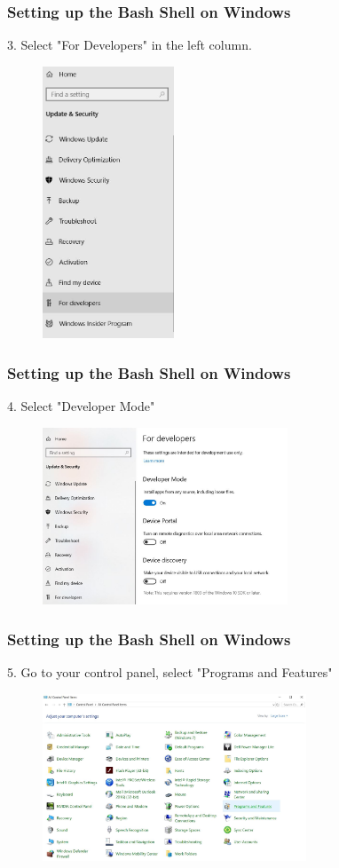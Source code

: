 \documentclass{if-beamer}
\begin{document}
\begin{frame}
\frametitle{Setting up the Bash Shell on Windows}
3. Select "For Developers" in the left column.
\begin{figure}
	\flushleft
	\includegraphics[width=0.35\textwidth]{figures/step3.jpg}
\end{figure}
\end{frame}

\begin{frame}
\frametitle{Setting up the Bash Shell on Windows}
4. Select "Developer Mode"
\begin{figure}
	\centering
	\includegraphics[width=0.65\textwidth]{figures/step4.jpg}
\end{figure}
\end{frame}

\begin{frame}
\frametitle{Setting up the Bash Shell on Windows}
5. Go to your control panel, select "Programs and Features"
\begin{figure}
	\centering
	\includegraphics[width=0.7\textwidth]{figures/step5.jpg}
\end{figure}
\end{frame}
\end{document}
